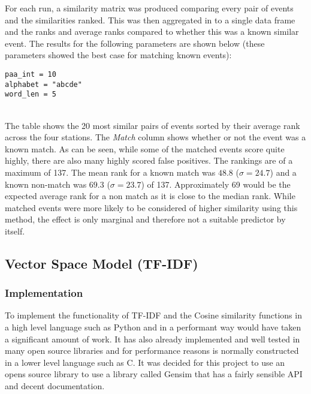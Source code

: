 \documentclass[../report.tex]{subfiles}
\begin{document}
	For each run, a similarity matrix was produced comparing every pair of events and the similarities ranked.  This was then aggregated in to a single data frame and the ranks and average ranks compared to whether this was a known similar event.  The results for the following parameters are shown below (these parameters showed the best case for matching known events):
	
\begin{verbatim}
paa_int = 10
alphabet = "abcde"
word_len = 5
\end{verbatim}

\\

	The table shows the 20 most similar pairs of events sorted by their average rank across the four stations.  The \textit{Match} column shows whether or not the event was a known match.  As can be seen, while some of the matched events score quite highly, there are also many highly scored false positives.  The rankings are of a maximum of 137.  The mean rank for a known match was $48.8$ ($\sigma = 24.7$) and a known non-match was $69.3$ ($\sigma = 23.7$) of 137.  Approximately 69 would be the expected average rank for a non match as it is close to the median rank.  While matched events were more likely to be considered of higher similarity using this method, the effect is only marginal and therefore not a suitable predictor by itself.

\subsection{Vector Space Model (TF-IDF)}
\subsubsection{Implementation}

	To implement the functionality of TF-IDF and the Cosine similarity functions in a high level language such as Python and in a performant way would have taken a significant amount of work.  It has also already implemented and well tested in many open source libraries and for performance reasons is normally constructed in a lower level language such as C.  It was decided for this project to use an opens source library to use a library called Gensim \citep{rehurek_lrec} that has a fairly sensible API and decent documentation.
	
\end{document}
